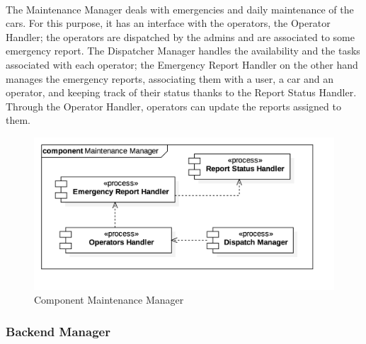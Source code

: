 		\paragraph{} The Maintenance Manager deals with emergencies and daily maintenance of the cars. For this purpose, it has an interface with the operators, the Operator Handler; the operators are dispatched by the admins and are associated to some emergency report. The Dispatcher Manager handles the availability and the tasks associated with each operator; the Emergency Report Handler on the other hand manages the emergency reports, associating them with a user, a car and an operator, and keeping track of their status thanks to the Report Status Handler. Through the Operator Handler, operators can update the reports assigned to them.
		\begin{figure}[h]
			\includegraphics[scale=0.4, center]{img/component_diagrams/06_maintenance_manager.png}
			\caption{Component Maintenance Manager}
		\end{figure}	
		

\FloatBarrier		
		
		
		
		\subsubsection*{Backend Manager}
			
			
